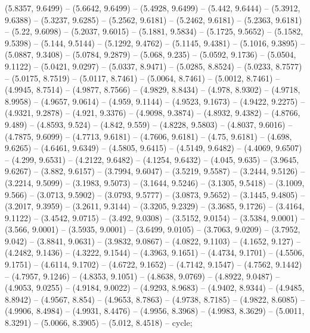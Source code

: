 (5.8357, 9.6499) -- (5.6642, 9.6499) -- (5.4928, 9.6499) -- (5.442, 9.6444) -- (5.3912, 9.6388) -- (5.3237, 9.6285) -- (5.2562, 9.6181) -- (5.2462, 9.6181) -- (5.2363, 9.6181) -- (5.22, 9.6098) -- (5.2037, 9.6015) -- (5.1881, 9.5834) -- (5.1725, 9.5652) -- (5.1582, 9.5398) -- (5.144, 9.5144) -- (5.1292, 9.4762) -- (5.1145, 9.4381) -- (5.1016, 9.3895) -- (5.0887, 9.3408) -- (5.0784, 9.2879) -- (5.068, 9.235) -- (5.0592, 9.1736) -- (5.0504, 9.1122) -- (5.0421, 9.0297) -- (5.0337, 8.9471) -- (5.0285, 8.8524) -- (5.0233, 8.7577) -- (5.0175, 8.7519) -- (5.0117, 8.7461) -- (5.0064, 8.7461) -- (5.0012, 8.7461) -- (4.9945, 8.7514) -- (4.9877, 8.7566) -- (4.9829, 8.8434) -- (4.978, 8.9302) -- (4.9718, 8.9958) -- (4.9657, 9.0614) -- (4.959, 9.1144) -- (4.9523, 9.1673) -- (4.9422, 9.2275) -- (4.9321, 9.2878) -- (4.921, 9.3376) -- (4.9098, 9.3874) -- (4.8932, 9.4382) -- (4.8766, 9.489) -- (4.8593, 9.524) -- (4.842, 9.559) -- (4.8228, 9.5803) -- (4.8037, 9.6016) -- (4.7875, 9.6099) -- (4.7713, 9.6181) -- (4.7606, 9.6181) -- (4.75, 9.6181) -- (4.698, 9.6265) -- (4.6461, 9.6349) -- (4.5805, 9.6415) -- (4.5149, 9.6482) -- (4.4069, 9.6507) -- (4.299, 9.6531) -- (4.2122, 9.6482) -- (4.1254, 9.6432) -- (4.045, 9.635) -- (3.9645, 9.6267) -- (3.882, 9.6157) -- (3.7994, 9.6047) -- (3.5219, 9.5587) -- (3.2444, 9.5126) -- (3.2214, 9.5099) -- (3.1983, 9.5073) -- (3.1644, 9.5246) -- (3.1305, 9.5418) -- (3.1009, 9.566) -- (3.0713, 9.5902) -- (3.0793, 9.5777) -- (3.0873, 9.5652) -- (3.1445, 9.4805) -- (3.2017, 9.3959) -- (3.2611, 9.3144) -- (3.3205, 9.2329) -- (3.3685, 9.1726) -- (3.4164, 9.1122) -- (3.4542, 9.0715) -- (3.492, 9.0308) -- (3.5152, 9.0154) -- (3.5384, 9.0001) -- (3.566, 9.0001) -- (3.5935, 9.0001) -- (3.6499, 9.0105) -- (3.7063, 9.0209) -- (3.7952, 9.042) -- (3.8841, 9.0631) -- (3.9832, 9.0867) -- (4.0822, 9.1103) -- (4.1652, 9.127) -- (4.2482, 9.1436) -- (4.3222, 9.1544) -- (4.3963, 9.1651) -- (4.4734, 9.1701) -- (4.5506, 9.1751) -- (4.6114, 9.1702) -- (4.6722, 9.1652) -- (4.7142, 9.1547) -- (4.7562, 9.1442) -- (4.7957, 9.1246) -- (4.8353, 9.1051) -- (4.8638, 9.0769) -- (4.8922, 9.0487) -- (4.9053, 9.0255) -- (4.9184, 9.0022) -- (4.9293, 8.9683) -- (4.9402, 8.9344) -- (4.9485, 8.8942) -- (4.9567, 8.854) -- (4.9653, 8.7863) -- (4.9738, 8.7185) -- (4.9822, 8.6085) -- (4.9906, 8.4984) -- (4.9931, 8.4476) -- (4.9956, 8.3968) -- (4.9983, 8.3629) -- (5.0011, 8.3291) -- (5.0066, 8.3905) -- (5.012, 8.4518) -- cycle;



